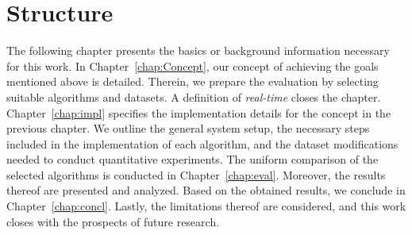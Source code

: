 \documentclass[main.tex]{subfiles}
\begin{document}
\section{Structure}
The following chapter presents the basics or background information necessary for this work.
In Chapter~\ref{chap:Concept}, our concept of achieving the goals mentioned above is detailed.
Therein, we prepare the evaluation by selecting suitable algorithms and datasets. A definition of \textit{real-time} closes the chapter.
Chapter~\ref{chap:impl} specifies the implementation details for the concept in the previous chapter. We outline the general system setup, the necessary steps included in the implementation of each algorithm, and the dataset modifications needed to conduct quantitative experiments.
The uniform comparison of the selected algorithms is conducted in Chapter~\ref{chap:eval}. Moreover, the results thereof are presented and analyzed.
Based on the obtained results, we conclude in Chapter~\ref{chap:concl}. Lastly, the limitations thereof are
considered, and this work closes with the prospects of future research.
\end{document}
